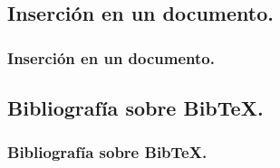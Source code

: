 \documentclass{beamer}
\begin{document}
\subsection{Inserción en un documento.}
\begin{frame}
  \frametitle{Inserción en un documento.}
\end{frame}

\subsection{Bibliografía sobre BibTeX.}
\begin{frame}
  \frametitle{Bibliografía sobre BibTeX.}
\end{frame}
\end{document}
